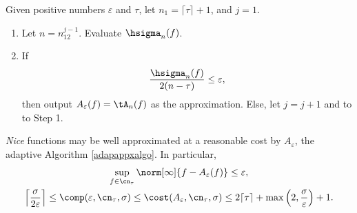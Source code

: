 \begin{algo} \label{adapappxalgo} Given positive numbers $\varepsilon$ and $\tau$, let $n_1=\lceil \tau \rceil +1$, and $j=1$. 
\begin{enumerate}
\renewcommand{\labelenumi}{Step \arabic{enumi}.} 
\item Let $n=n_12^{j-1}$.  Evaluate $\hsigma_{n}(f)$.
\item If 
\[
\frac{\hsigma_n(f)}{2(n - \tau)} \le 
\varepsilon,
\]
then output $A_{\varepsilon}(f) = \tA_{n}(f)$ as the approximation.  Else, let $j=j+1$ and to to Step 1.
\end{enumerate}
\end{algo}

\begin{theorem} \label{adapappxthm}  \emph{Nice} functions may be well approximated at a reasonable cost by $A_{\varepsilon}$, the adaptive Algorithm \ref{adapappxalgo}.  In particular,
\begin{gather*}
\sup_{f \in \cn_{\tau}} \norm[\infty]{f - A_{\varepsilon}(f)} \le \varepsilon, \\
\left \lceil \frac{\sigma}{2\varepsilon} \right \rceil \le \comp(\varepsilon,\cn_{\tau},\sigma) \le \cost(A_{\varepsilon},\cn_{\tau},\sigma) \le 2 \lceil \tau \rceil + \max\left(2,\frac{\sigma}{\varepsilon} \right) + 1.
\end{gather*}
\end{theorem}
